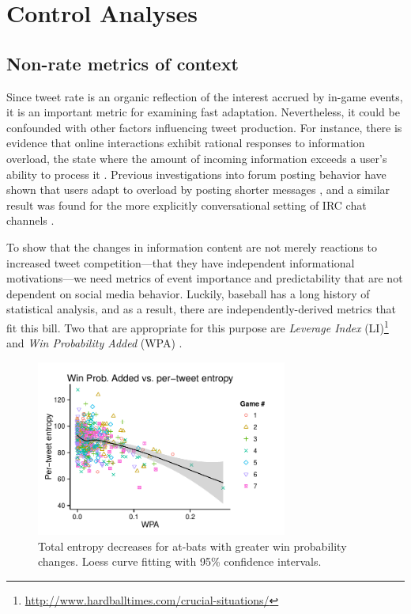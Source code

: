 \documentclass[11pt,letterpaper]{article}
\begin{document}
\section{Control Analyses}

\subsection{Non-rate metrics of context}\label{sect:other-metrics}

Since tweet rate is an organic reflection of the interest accrued by in-game events, it is an important metric for examining fast adaptation. Nevertheless, it could be confounded with other factors influencing tweet production.  For instance, there is evidence that online interactions exhibit rational responses to information overload, the state where the amount of incoming information exceeds a user's ability to process it \cite{miller1956,schoberth2003}.  Previous investigations into forum posting behavior have shown that users adapt to overload by posting shorter messages \cite{jones2001a,jones2001b,whittaker2003,schoberth2003}, and a similar result was found for the more explicitly conversational setting of IRC chat channels \cite{jones2008}.   

To show that the changes in information content are not merely reactions to increased tweet competition---that they have independent informational motivations---we need metrics of event importance and predictability that are not dependent on social media behavior.  Luckily, baseball has a long history of statistical analysis, and as a result, there are independently-derived metrics that fit this bill.  Two that are appropriate for this purpose are {\it Leverage Index} (LI)\footnote{\url{http://www.hardballtimes.com/crucial-situations/}} and  {\it Win Probability Added} (WPA) \cite{tango2007}.


\begin{figure}
 \centering
  \includegraphics[width=3.25in]{figures/fig3.pdf}
 \caption{Total entropy decreases for at-bats with greater win probability changes. Loess curve fitting with 95\% confidence intervals.}\label{fig:wpa-tent-agg}\vspace*{-.5em}
\end{figure}
\end{document}
